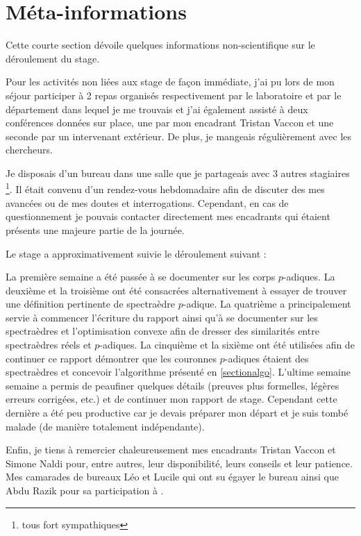 \section{Méta-informations}

Cette courte section dévoile quelques informations non-scientifique sur le déroulement du stage.

Pour les activités non liées aux stage de façon immédiate, j'ai pu lors de mon séjour participer à 2 repas organisés respectivement par le laboratoire et par le département dans lequel je me trouvais et j'ai également assisté à deux conférences données sur place, une par mon encadrant Tristan Vaccon et une seconde par un intervenant extérieur. De plus, je mangeais régulièrement avec les chercheurs.

Je disposais d'un bureau dans une salle que je partageais avec 3 autres stagiaires \footnote{tous fort sympathiques}. Il était convenu d'un rendez-vous hebdomadaire afin de discuter des mes avancées ou de mes doutes et interrogations. Cependant, en cas de questionnement je pouvais contacter directement mes encadrants qui étaient présents une majeure partie de la journée.

Le stage a approximativement suivie le déroulement suivant :

La première semaine a été passée à se documenter sur les corps $p$-adiques. La deuxième et la troisième ont été consacrées alternativement à essayer de trouver une définition pertinente de spectraèdre $p$-adique. La quatrième a principalement servie à commencer l'écriture du rapport ainsi qu'à se documenter sur les spectraèdres et l'optimisation convexe afin de dresser des similarités entre spectraèdres réels et $p$-adiques. La cinquième et la sixième ont été utilisées afin de continuer ce rapport démontrer que les couronnes $p$-adiques étaient des spectraèdres et concevoir l'algorithme présenté en \ref{sectionalgo}. L'ultime semaine semaine a permis de peaufiner quelques détails (preuves plus formelles, légères erreurs corrigées, etc.) et de continuer mon rapport de stage. Cependant cette dernière a été peu productive car je devais préparer mon départ et je suis tombé malade (de manière totalement indépendante).

Enfin, je tiens à remercier chaleureusement mes encadrants Tristan Vaccon et Simone Naldi pour, entre autres, leur disponibilité, leurs conseils et leur patience. Mes camarades de bureaux Léo et Lucile qui ont su égayer le bureau ainsi que Abdu Razik pour sa participation à \cite{rozik_borgir_2021}. 
